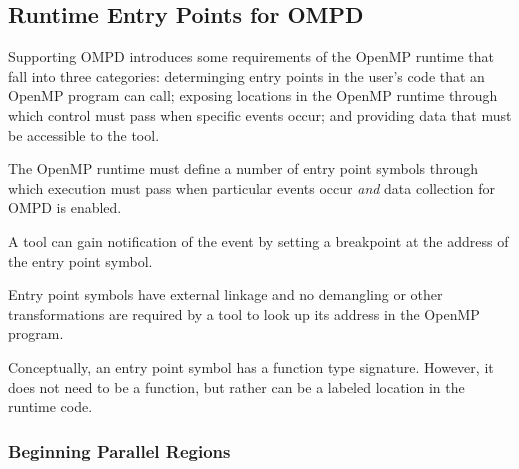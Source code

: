 \subsection{Runtime Entry Points for OMPD}
\label{subsec:runtime-entry-points-for-ompd}

Supporting OMPD introduces some requirements of the OpenMP 
runtime
that
fall into three categories: determinging entry points in the user's code that
an OpenMP program can call; exposing locations in the OpenMP runtime through
which control must pass when specific events occur; and providing data that must
be accessible to the tool.


The OpenMP runtime must define a number of entry point symbols
through which execution must pass when particular events occur
\emph{and} data collection for OMPD is enabled.


A tool can gain notification of the event by setting 
a breakpoint at the address of the entry point symbol.

\restrictions

Entry point symbols have external  linkage and no
demangling or other transformations are required by a tool
to look up its address in the OpenMP program.

Conceptually, an entry point symbol has a function type signature.
However, it does not need to be a function, but rather can be a labeled location
in the runtime code.


\subsubsection{Beginning Parallel Regions}
\label{subsubsec:ompd_bp_parallel_begin}

